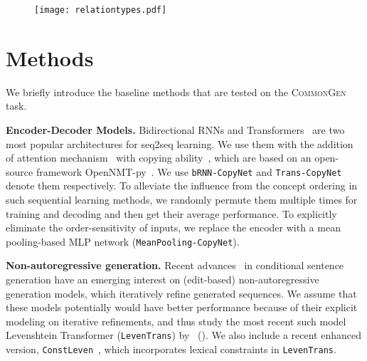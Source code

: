 \documentclass[11pt,a4paper]{article}
\begin{document}
\begin{figure}[!t]
	\centering
	\texttt{[image: relationtypes.pdf]}
	\label{tab:cate}
\end{figure}



	
	
				
%
 	














\section{Methods}
\label{sec:baseline}
We briefly introduce the  baseline methods that are tested on the \textsc{CommonGen} task.



\smallskip
\noindent
\textbf{Encoder-Decoder Models.}
Bidirectional RNNs and Transformers~\cite{Vaswani2017AttentionIA} are two most popular architectures for seq2seq learning.
We use them with the addition of attention mechanism~\cite{Luong2015EffectiveAT} with copying ability~\cite{gu-etal-2016-incorporating}, which are based on an open-source framework OpenNMT-py~\cite{Klein2017OpenNMTOT}.
We use \texttt{bRNN-CopyNet} and \texttt{Trans-CopyNet} denote them respectively.
To alleviate the influence from the concept ordering in such sequential learning methods, 
we randomly permute them multiple times  for training and decoding and then get their average performance.
To explicitly eliminate the order-sensitivity of inputs,
we replace the encoder with a mean pooling-based MLP network (\texttt{MeanPooling-CopyNet}).


\smallskip
\noindent
\textbf{Non-autoregressive generation.} 
Recent advances~\cite{Lee2018DeterministicNN, Stern2019InsertionTF} in conditional sentence generation have an emerging interest on (edit-based) non-autoregressive generation models, which iteratively refine generated sequences.
We assume that these models potentially would have better performance because of their explicit modeling on iterative refinements, and thus study the most recent such model {Levenshtein Transformer} (\texttt{LevenTrans}) by~\citeauthor{Gu2019LevenshteinT} (\citeyear{Gu2019LevenshteinT}). 
We also include a recent enhanced version, \texttt{ConstLeven}~\cite{Susanto2020LexicallyCN}, which incorporates lexical constraints in \texttt{LevenTrans}.
\end{document}
